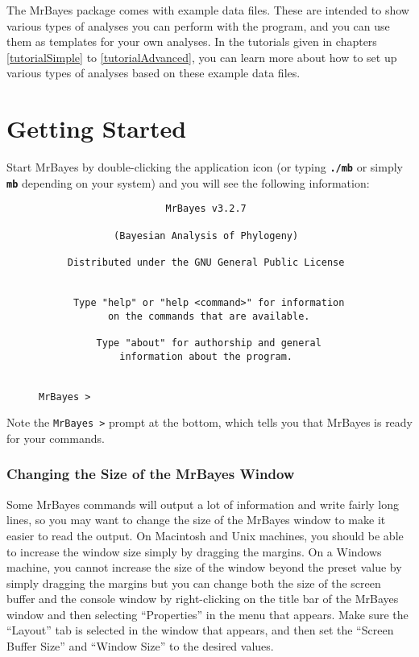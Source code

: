 \documentclass[12pt]{book}
\newcommand{\ttt}[1]{\texttt{#1}}
\newcommand{\tb}[1]{\ttt{\textbf{#1}}}
\begin{document}
The MrBayes package comes with example data files. These are intended to show various types of
analyses you can perform with the program, and you can use them as templates for your own analyses.
In the tutorials given in chapters \ref{tutorialSimple} to \ref{tutorialAdvanced}, you can learn
more about how to set up various types of analyses based on these example data files.

\newpage

\section{Getting Started}

Start MrBayes by double-clicking the application icon (or typing \tb{./mb} or simply \tb{mb}
depending on your system) and you will see the following information:

\begin{figure}[H]
\centering
\begin{BVerbatim}
                      MrBayes v3.2.7

             (Bayesian Analysis of Phylogeny)

     Distributed under the GNU General Public License


      Type "help" or "help <command>" for information
            on the commands that are available.

          Type "about" for authorship and general
              information about the program.


MrBayes >
\end{BVerbatim}
\end{figure}

Note the \texttt{MrBayes >} prompt at the bottom, which tells you that MrBayes is ready for your
commands.

\subsubsection{Changing the Size of the MrBayes Window}

Some MrBayes commands will output a lot of information and write fairly long lines, so you may want
to change the size of the MrBayes window to make it easier to read the output. On Macintosh and
Unix machines, you should be able to increase the window size simply by dragging the margins. On a
Windows machine, you cannot increase the size of the window beyond the preset value by simply
dragging the margins but you can change both the size of the screen buffer and the console window
by right-clicking on the title bar of the MrBayes window and then selecting ``Properties'' in the
menu that appears. Make sure the ``Layout'' tab is selected in the window that appears, and then
set the ``Screen Buffer Size'' and ``Window Size'' to the desired values.
\end{document}
